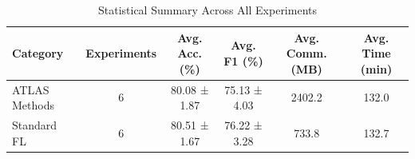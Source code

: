 \begin{table}[!t]
\renewcommand{\arraystretch}{1.2}
\caption{Statistical Summary Across All Experiments}
\label{tab:statistical_summary}
\centering
\begin{tabular}{l|c|cc|cc}
\hline\hline
Category & Experiments & Avg. Acc. (\%) & Avg. F1 (\%) & Avg. Comm. (MB) & Avg. Time (min) \\
\hline
ATLAS Methods & 6 & 80.08 ± 1.87 & 75.13 ± 4.03 & 2402.2 & 132.0 \\
Standard FL & 6 & 80.51 ± 1.67 & 76.22 ± 3.28 & 733.8 & 132.7 \\
\hline\hline
\end{tabular}
\end{table}
